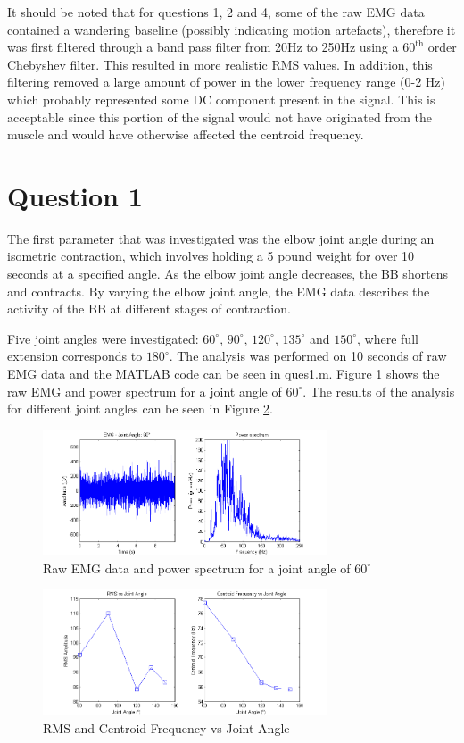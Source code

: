 \documentclass[11pt]{article}
\numberwithin{equation}{section}	%
\begin{document}
It should be noted that for questions 1, 2 and 4, some of the raw EMG data contained a wandering baseline (possibly indicating motion artefacts), therefore it was first filtered through a band pass filter from 20Hz to 250Hz using a \(60^\textrm{th}\) order Chebyshev filter. This resulted in more realistic RMS values. In addition, this filtering removed a large amount of power in the lower frequency range (0-2 Hz) which probably represented some DC component present in the signal. This is acceptable since this portion of the signal would not have originated from the muscle and would have otherwise affected the centroid frequency. 

\section*{Question 1}
The first parameter that was investigated was the elbow joint angle during an isometric contraction, which involves holding a 5 pound weight for over 10 seconds at a specified angle. As the elbow joint angle decreases, the BB shortens and contracts. By varying the elbow joint angle, the EMG data describes the activity of the BB at different stages of contraction. 

Five joint angles were investigated: \(60^\circ\), \(90^\circ\), \(120^\circ\), \(135^\circ\) and \(150^\circ\), where full extension corresponds to \(180^\circ\). The analysis was performed on 10 seconds of raw EMG data and the MATLAB code can be seen in ques1.m. Figure \ref{fig1a} shows the raw EMG and power spectrum for a joint angle of \(60^{\circ}\). The results of the analysis for different joint angles can be seen in Figure \ref{fig1b}. 

\begin{figure}[!ht]
  \centering
    \includegraphics[width=0.75\textwidth]{fig1a}
	\caption{Raw EMG data and power spectrum for a joint angle of \(60^{\circ}\)}
	\label{fig1a}
\end{figure}
\begin{figure}[!ht]
  \centering
    \includegraphics[width=0.75\textwidth]{fig1b}
	\caption{RMS and Centroid Frequency vs Joint Angle}
	\label{fig1b}
\end{figure}
\end{document}

